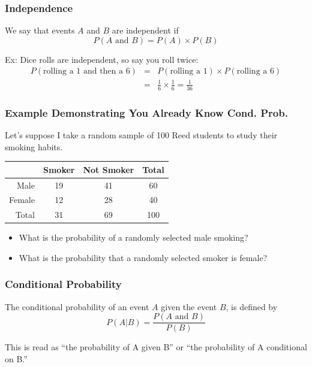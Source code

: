 \documentclass[handout]{beamer}
\newcommand{\blue}[1]{\textcolor{blue2}{#1}}
\begin{document}
\begin{frame}
\frametitle{Independence}
We say that events $A$ and $B$ are \blue{independent} if
\[
P(A \mbox{ and } B) = P(A) \times P(B)
\]

\vspace{0.5cm}

\pause Ex: Dice rolls are independent, so say you roll twice:
\begin{eqnarray*}
P(\mbox{rolling a 1 and then a 6}) &=& P(\mbox{rolling a 1}) \times P(\mbox{rolling a 6})\\
&=& \frac{1}{6}\times\frac{1}{6} = \frac{1}{36}
\end{eqnarray*}

\end{frame}


\begin{frame}
\frametitle{Example Demonstrating You Already Know Cond. Prob.}

Let's suppose I take a random sample of 100 Reed students to study their smoking habits.
\begin{center}
  \begin{tabular}{r|cc|c}
	&Smoker&Not Smoker&Total\\
	\hline
Male&19&41&60\\
Female&12&28&40\\
\hline
Total&31&69&100\\
\end{tabular}
\end{center}

\begin{small}
\begin{itemize}
\pause \item What is the probability of a randomly selected male smoking?
\vspace{1cm}
\pause \item What is the probability that a randomly selected smoker is female?
\end{itemize}
\end{small}

\end{frame}


\begin{frame}
\frametitle{Conditional Probability}
The \blue{conditional probability} of an event $A$ given the event $B$, is defined by
\[
P(A|B) = \frac{P(A \mbox{ and } B)}{P(B)}
\]  

\vspace{0.5cm}

This is read as ``the probability of A \blue{given} B'' or ``the probability of A \blue{conditional on} B.''

\end{frame}
\end{document}
